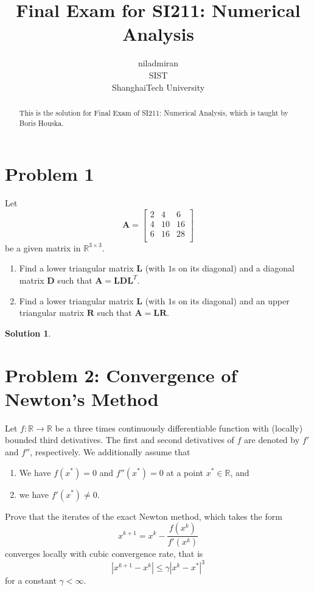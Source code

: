 \documentclass{article}
\title{Final Exam for SI211: Numerical Analysis}
\author{%
  {niladmiran} \\
  SIST\\
  ShanghaiTech University\\
}
\theoremstyle{definition}
\newtheorem{solution}{Solution}
\begin{document}
\maketitle

\begin{abstract}
  This is the solution for Final Exam of SI211: Numerical Analysis, which is taught by Boris Houska.

\end{abstract}

\section{Problem 1}
Let 
\begin{equation}
  \mathbf{A}=\begin{bmatrix}
    2& 4& 6\\
    4& 10& 16\\
    6& 16& 28\\
  \end{bmatrix}
\end{equation}
be a given matrix in $\mathbb{R}^{3\times 3}$.
\begin{enumerate}
  \item Find a lower triangular matrix $\mathbf{L}$ (with $1$s on its diagonal) and a diagonal matrix $\mathbf{D}$ such that $\mathbf{A}=\mathbf{L}\mathbf{D}\mathbf{L}^T$.
  \item Find a lower triangular matrix $\mathbf{L}$ (with $1$s on its diagonal) and an upper triangular matrix $\mathbf{R}$ such that $\mathbf{A}=\mathbf{L}\mathbf{R}$.
\end{enumerate}


\begin{solution}

\end{solution}



\section{Problem 2: Convergence of Newton's Method}
Let $f:\mathbb{R}\to\mathbb{R}$ be a three times continuously differentiable function with (locally) bounded third detivatives. The first and second detivatives of $f$ are denoted by $f'$ and $f''$, respectively. We additionally assume that 
\begin{enumerate}
  \item We have $f(x^*)=0$ and $f''(x^*)=0$ at a point $x^*\in\mathbb{R}$, and 
  \item we have $f'(x^*)\neq 0$.
\end{enumerate}
Prove that the iterates of the exact Newton method, which takes the form
\begin{equation*}
  x^{k+1}=x^k-\frac{f(x^k)}{f'(x^k)}
\end{equation*}
converges locally with cubic convergence rate, that is
\begin{equation*}
  |x^{k+1}-x^k|\leq \gamma|x^k-x^*|^3
\end{equation*}
for a constant $\gamma<\infty$.
\end{document}
